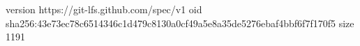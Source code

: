 version https://git-lfs.github.com/spec/v1
oid sha256:43e73ec78c6514346c1d479c8130a0cf49a5e8a35de5276ebaf4bbf6f7f170f5
size 1191
